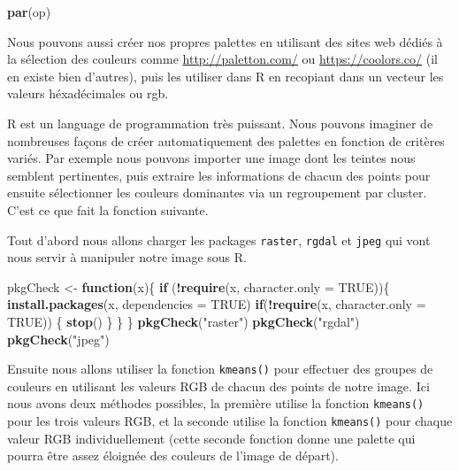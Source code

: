 \documentclass[
]{book}
\newenvironment{Shaded}{\begin{snugshade}}{\end{snugshade}}
\newcommand{\ControlFlowTok}[1]{\textcolor[rgb]{0.13,0.29,0.53}{\textbf{#1}}}
\newcommand{\DataTypeTok}[1]{\textcolor[rgb]{0.13,0.29,0.53}{#1}}
\newcommand{\KeywordTok}[1]{\textcolor[rgb]{0.13,0.29,0.53}{\textbf{#1}}}
\newcommand{\NormalTok}[1]{#1}
\newcommand{\OperatorTok}[1]{\textcolor[rgb]{0.81,0.36,0.00}{\textbf{#1}}}
\newcommand{\OtherTok}[1]{\textcolor[rgb]{0.56,0.35,0.01}{#1}}
\newcommand{\StringTok}[1]{\textcolor[rgb]{0.31,0.60,0.02}{#1}}
\begin{document}
\begin{Shaded}
\begin{Highlighting}[]
\KeywordTok{par}\NormalTok{(op)}
\end{Highlighting}
\end{Shaded}

Nous pouvons aussi créer nos propres palettes en utilisant des sites web dédiés à la sélection des couleurs comme \url{http://paletton.com/} ou \url{https://coolors.co/} (il en existe bien d'autres), puis les utiliser dans R en recopiant dans un vecteur les valeurs héxadécimales ou rgb.

R est un language de programmation très puissant. Nous pouvons imaginer de nombreuses façons de créer automatiquement des palettes en fonction de critères variés. Par exemple nous pouvons importer une image dont les teintes nous semblent pertinentes, puis extraire les informations de chacun des points pour ensuite sélectionner les couleurs dominantes via un regroupement par cluster. C'est ce que fait la fonction suivante.

Tout d'abord nous allons charger les packages \texttt{raster}, \texttt{rgdal} et \texttt{jpeg} qui vont nous servir à manipuler notre image sous R.

\begin{Shaded}
\begin{Highlighting}[]
\NormalTok{pkgCheck <-}\StringTok{ }\ControlFlowTok{function}\NormalTok{(x)\{ }
    \ControlFlowTok{if}\NormalTok{ (}\OperatorTok{!}\KeywordTok{require}\NormalTok{(x, }\DataTypeTok{character.only =} \OtherTok{TRUE}\NormalTok{))\{}
        \KeywordTok{install.packages}\NormalTok{(x, }\DataTypeTok{dependencies =} \OtherTok{TRUE}\NormalTok{)}
        \ControlFlowTok{if}\NormalTok{(}\OperatorTok{!}\KeywordTok{require}\NormalTok{(x, }\DataTypeTok{character.only =} \OtherTok{TRUE}\NormalTok{)) \{}
            \KeywordTok{stop}\NormalTok{()}
\NormalTok{        \}}
\NormalTok{    \}}
\NormalTok{\}}
\KeywordTok{pkgCheck}\NormalTok{(}\StringTok{"raster"}\NormalTok{)}
\KeywordTok{pkgCheck}\NormalTok{(}\StringTok{"rgdal"}\NormalTok{)}
\KeywordTok{pkgCheck}\NormalTok{(}\StringTok{"jpeg"}\NormalTok{)}
\end{Highlighting}
\end{Shaded}

Ensuite nous allons utiliser la fonction \texttt{kmeans()} pour effectuer des groupes de couleurs en utilisant les valeurs RGB de chacun des points de notre image. Ici nous avons deux méthodes possibles, la première utilise la fonction \texttt{kmeans()} pour les trois valeurs RGB, et la seconde utilise la fonction \texttt{kmeans()} pour chaque valeur RGB individuellement (cette seconde fonction donne une palette qui pourra être assez éloignée des couleurs de l'image de départ).
\end{document}

